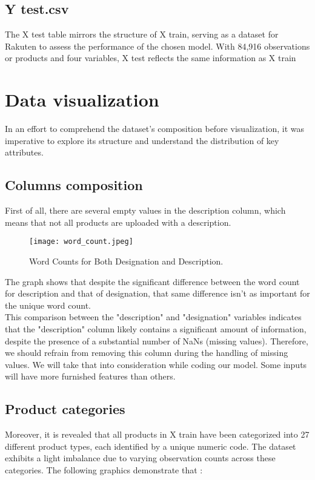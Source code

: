 \subsection{Y test.csv}
The X test table mirrors the structure of X train, serving as a dataset for Rakuten to assess the performance of the chosen model. With 84,916 observations or products and four variables, X test reflects the same information as X train

\section{Data visualization}
In an effort to comprehend the dataset's composition before visualization, it was imperative to explore its structure and understand the distribution of key attributes.\\

\subsection{Columns composition}
First of all, there are several empty values in the description column, which means that not all products are uploaded with a description. \\


\begin{figure}[h]
    \centering
    \texttt{[image: word\_count.jpeg]}
    \caption{Word Counts for Both Designation and Description.}
    \label{fig:word_count}
\end{figure}

The graph shows that despite the significant difference between the word count for description and that of designation, that same difference isn't as important for the unique word count. \\
This comparison between the "description" and "designation" variables indicates that the "description" column likely contains a significant amount of information, despite the presence of a substantial number of NaNs (missing values). Therefore, we should refrain from removing this column during the handling of missing values. We will take that into consideration while coding our model. Some inputs will have more furnished features than others. \\

\subsection{Product categories}
Moreover, it is revealed that all products in X train have been categorized into 27 different product types, each identified by a unique numeric code. The dataset exhibits a light imbalance due to varying observation counts across these categories.
The following graphics demonstrate that : \\

